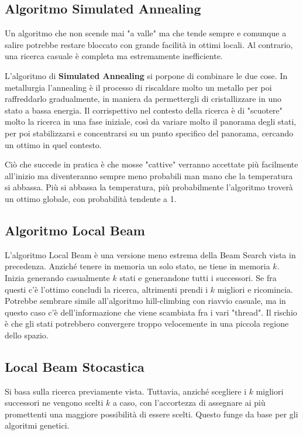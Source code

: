     \subsection{Algoritmo Simulated Annealing}
        Un algoritmo che non scende mai "a valle" ma che tende sempre e comunque a salire potrebbe restare bloccato con grande facilità in ottimi locali. Al contrario, una ricerca casuale è completa ma estremamente inefficiente.
        
        L'algoritmo di \textbf{Simulated Annealing} si porpone di combinare le due cose. In metallurgia l'annealing è il processo di riscaldare molto un metallo per poi raffreddarlo gradualmente, in maniera da permettergli di cristallizzare in uno stato a bassa energia. Il corrispettivo nel contesto della ricerca è di "scuotere" molto la ricerca in una fase iniziale, così da variare molto il panorama degli stati, per poi stabilizzarsi e concentrarsi su un punto specifico del panorama, cercando un ottimo in quel contesto.
        
        Ciò che succede in pratica è che mosse "cattive" verranno accettate più facilmente all'inizio ma diventeranno sempre meno probabili man mano che la temperatura si abbassa. Più si abbassa la temperatura, più probabilmente l'algoritmo troverà un ottimo globale, con probabilità tendente a 1.
        
    \subsection{Algoritmo Local Beam}
        L'algoritmo Local Beam è una versione meno estrema della Beam Search vista in precedenza. Anziché tenere in memoria un solo stato, ne tiene in memoria $k$. Inizia generando casualmente $k$ stati e generandone tutti i successori. Se fra questi c'è l'ottimo concludi la ricerca, altrimenti prendi i $k$ migliori e ricomincia. Potrebbe sembrare simile all'algoritmo hill-climbing con riavvio casuale, ma in questo caso c'è dell'informazione che viene scambiata fra i vari "thread". Il rischio è che gli stati potrebbero convergere troppo velocemente in una piccola regione dello spazio.
        
    \subsection{Local Beam Stocastica}
        Si basa sulla ricerca previamente vista. Tuttavia, anziché scegliere i $k$ migliori successori ne vengono scelti $k$ a caso, con l'accortezza di assegnare ai più promettenti una maggiore possibilità di essere scelti. Questo funge da base per gli algoritmi genetici.
       
